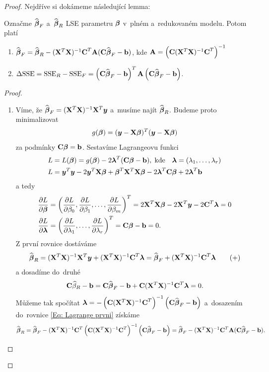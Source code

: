 \begin{proof}

\newcommand{\yb}{\boldsymbol{y}}
\newcommand{\lambdab}{\boldsymbol{\lambda}}
\newcommand{\xtx}{(\X^T \X)^{-1}}
\newcommand{\parcialni}[2]{\frac{\partial #1}{\partial #2}}

Nejdříve si dokámeme následující lemma:
\begin{lemma}
	Označme $\widehat{\boldsymbol{\beta}}_F$ a~$\widehat{\boldsymbol{\beta}}_R$ LSE parametru $\boldsymbol{\beta}$ v~plném a~redukovaném modelu. Potom platí
	\begin{enumerate}
		\item $\widehat{\boldsymbol{\beta}}_F = \widehat{\boldsymbol{\beta}}_R - (\mathbf{X}^T \mathbf{X})^{-1} \textbf{C}^T \textbf{A} (\textbf{C} \widehat{\boldsymbol{\beta}}_F - \mathbf{b})$, kde $\textbf{A} = \left(\textbf{C} (\mathbf{X}^T \mathbf{X})^{-1} \textbf{C}^T \right)^{-1}$
		\item $\Delta \mathrm{SSE} = \mathrm{SSE}_R - \mathrm{SSE}_F = \left(\textbf{C} \widehat{\boldsymbol{\beta}}_F - \mathbf{b} \right)^T \textbf{A} \left(\textbf{C} \widehat{\boldsymbol{\beta}}_F - \mathbf{b} \right)$.
	\end{enumerate}
\end{lemma}

\begin{proof}
\begin{enumerate}
\item
Víme, že $\wbetab_F = \xtx \X^T \yb$ a~musíme najít $\widehat{\boldsymbol{\beta}}_R$. Budeme proto minimalizovat
 $$
g(\betab) = (\yb - \X \betab)^T(\yb - \X \betab)
 $$
za podmínky $\textbf{C} \boldsymbol{\beta} = \mathbf{b}$. Sestavíme Lagrangeovu funkci
\begin{align*}
L & = L(\betab) = g(\betab) - 2 \lambdab^T(\Cm \betab - \bb), \; \text{kde} \quad \lambdab = (\lambda_1,\dots, \lambda_r) \\
L & = \yb^T \yb - 2 \yb^T \X \betab + \betab^T \X^T \X \betab - 2 \lambdab^T \Cm \betab + 2 \lambdab^T \bb
\end{align*}
a tedy
\begin{align*}
\frac{\partial L}{\partial \betab} & = \left(\parcialni{L}{\beta_0}, \parcialni{L}{\beta_1},\dots, \parcialni{L}{\beta_m} \right)^T = 2 \X^T \X \betab - 2 \X^T \yb - 2 \Cm^T \lambdab = 0 \\
\parcialni{L}{\lambdab} & = \left(\parcialni{L}{\lambda_1},\dots, \parcialni{L}{\lambda_r} \right)^T = \Cm \betab - \bb = 0.
\end{align*}
Z první rovnice dostáváme
\begin{equation}
\wbetab_R = \xtx \X^T \yb + \xtx \Cm^T \lambdab = \wbetab_F + \xtx \Cm^T \lambdab \tag{+} \label{Eq: Lagrange prvni}
\end{equation}
a dosadíme do~druhé
 $$
\Cm \wbeta_R - \bb = \Cm \wbetab_F - \bb + \Cm \xtx \Cm^T \lambdab = 0.
 $$
Můžeme tak spočítat $\lambdab = -\left(\Cm \xtx \Cm^T\right)^{-1} \left(\Cm \wbetab_F - \bb \right)$ a~dosazením do~rovnice \eqref{Eq: Lagrange prvni} získáme
 $$
\wbetab_R = \wbetab_F - \xtx \Cm^T \left(\Cm \xtx \Cm^T \right)^{-1} \left(\Cm \wbetab_F - \bb \right) = \wbetab_F - \xtx \Cm^T \Am (\Cm \wbetab_F - \bb).
 $$


\end{enumerate}
\end{proof}
\end{proof}

